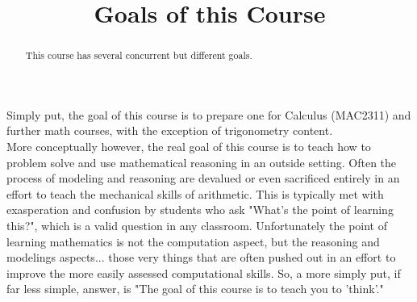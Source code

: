 \documentclass{ximeraXloud}
\title{Goals of this Course}
\begin{document}
\begin{abstract}
This course has several concurrent but different goals.
\end{abstract}
\maketitle

Simply put, the goal of this course is to prepare one for Calculus (MAC2311) and further math courses, with the exception of trigonometry content. \\

More conceptually however, the real goal of this course is to teach how to problem solve and use mathematical reasoning in an outside setting. Often the process of modeling and reasoning are devalued or even sacrificed entirely in an effort to teach the mechanical skills of arithmetic. This is typically met with exasperation and confusion by students who ask "What's the point of learning this?", which is a valid question in any classroom. Unfortunately the point of learning mathematics is not the computation aspect, but the reasoning and modelings aspects... those very things that are often pushed out in an effort to improve the more easily assessed computational skills. So, a more simply put, if far less simple, answer, is "The goal of this course is to teach you to 'think'." 
\end{document}
